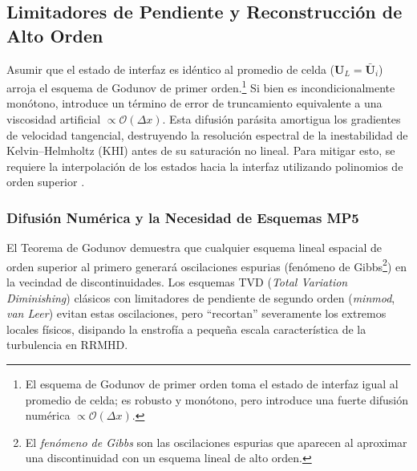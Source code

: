 \subsection{Limitadores de Pendiente y Reconstrucción de Alto Orden}

\primerparrafo Asumir que el estado de interfaz es idéntico al promedio de celda ($\mathbf{U}_L = \mathbf{\bar{U}}_i$) arroja el esquema de Godunov de primer orden.\footnote{El esquema de Godunov de primer orden toma el estado de interfaz igual al promedio de celda; es robusto y monótono, pero introduce una fuerte difusión numérica $\propto\mathcal{O}(\Delta x)$.} Si bien es incondicionalmente monótono, introduce un término de error de truncamiento equivalente a una viscosidad artificial $\propto \mathcal{O}(\Delta x)$. Esta difusión parásita amortigua los gradientes de velocidad tangencial, destruyendo la resolución espectral de la inestabilidad de Kelvin--Helmholtz (KHI) antes de su saturación no lineal. Para mitigar esto, se requiere la interpolación de los estados hacia la interfaz utilizando polinomios de orden superior \parencite{toro-2009}.

\subsubsection{Difusión Numérica y la Necesidad de Esquemas MP5}

\primerparrafo El Teorema de Godunov demuestra que cualquier esquema lineal espacial de orden superior al primero generará oscilaciones espurias (fenómeno de Gibbs\footnote{El \emph{fenómeno de Gibbs} son las oscilaciones espurias que aparecen al aproximar una discontinuidad con un esquema lineal de alto orden.}) en la vecindad de discontinuidades. Los esquemas TVD (\textit{Total Variation Diminishing}) clásicos con limitadores de pendiente de segundo orden (\textit{minmod}, \textit{van Leer}) evitan estas oscilaciones, pero ``recortan'' severamente los extremos locales físicos, disipando la enstrofía a pequeña escala característica de la turbulencia en RRMHD.


